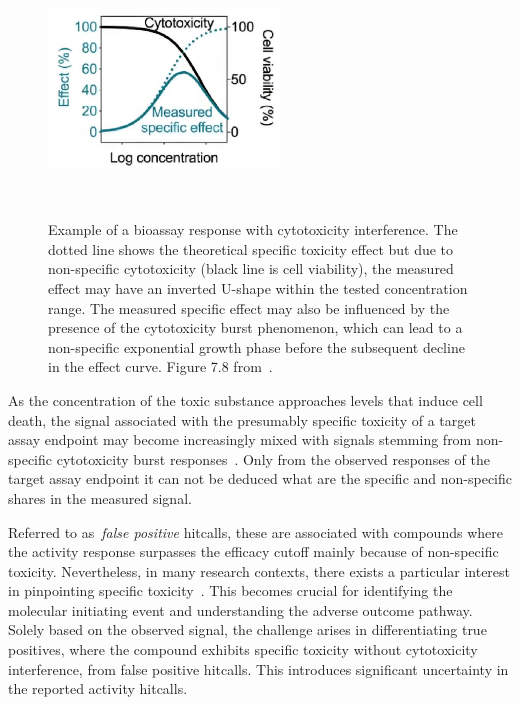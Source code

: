 \begin{figure}[htbp]  %
    \centering
    \includegraphics[width=0.55\textwidth]{figures/cytotoxicity.png}  
    \caption{Example of a bioassay response with cytotoxicity interference. The dotted line shows the theoretical specific toxicity effect but due to non-specific cytotoxicity (black line is cell viability), the measured effect may have an inverted U-shape within the tested concentration range. The measured specific effect may also be influenced by the presence of the cytotoxicity burst phenomenon, which can lead to a non-specific exponential growth phase before the subsequent decline in the effect curve. Figure 7.8 from~\cite{escher2021}.}
~\label{fig:cytotoxicity} 
\end{figure}

As the concentration of the toxic substance approaches levels that induce cell death, the signal associated with the presumably specific toxicity of a target assay endpoint may become increasingly mixed with signals stemming from non-specific cytotoxicity burst responses~\cite{escher2021}. Only from the observed responses of the target assay endpoint it can not be deduced what are the specific and non-specific shares in the measured signal.

Referred to as~\emph{false positive} hitcalls, these are associated with compounds where the activity response surpasses the efficacy cutoff mainly because of non-specific toxicity. Nevertheless, in many research contexts, there exists a particular interest in pinpointing specific toxicity~\cite{fay2018}. This becomes crucial for identifying the molecular initiating event and understanding the adverse outcome pathway. Solely based on the observed signal, the challenge arises in differentiating true positives, where the compound exhibits specific toxicity without cytotoxicity interference, from false positive hitcalls. This introduces significant uncertainty in the reported activity hitcalls.

